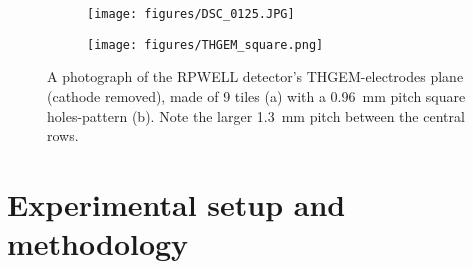 \begin{figure}[h]
\begin{subfigure}[t]{0.6\textwidth}\caption{}
\texttt{[image: figures/DSC\_0125.JPG]}
\end{subfigure}
\begin{subfigure}[t]{0.4\textwidth}\caption{}
\texttt{[image: figures/THGEM\_square.png]}
\end{subfigure}
\caption{A photograph of the RPWELL detector's THGEM-electrodes plane (cathode removed), made of 9 tiles (a) with a 0.96~mm pitch square holes-pattern (b). Note the larger 1.3~mm pitch between the central rows.}\label{fig: RPWELL detector}
\end{figure}


\section{Experimental setup and methodology}
\label{sec: setup and methodology}

